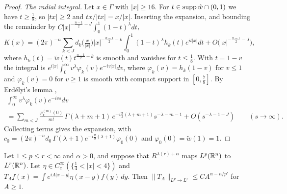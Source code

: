 \begin{proof}
\emph{The radial integral.} Let $x\in\Gamma$ with $|x|\ge16$. For $t\in\operatorname{supp}\tilde w\cap(0,1)$ we have $t\ge\frac18$,
so $|tx|\ge2$ and $tx/|tx|=x/|x|$. Inserting the expansion, and bounding the remainder by
$C|x|^{-\frac{n-1}2-J}\int_0^1(1-t)^\lambda dt$,
\[
K(x)=(2\pi)^{-n}\sum_{k<J}d_k\bigl(\tfrac x{|x|}\bigr)|x|^{-\frac{n-1}2-k}\int_0^1(1-t)^\lambda h_k(t)e^{it|x|}dt
+O\bigl(|x|^{-\frac{n-1}2-J}\bigr),
\]
where $h_k(t)=\tilde w(t)t^{\frac{n-1}2-k}$ is smooth and vanishes for $t\le\frac18$. With $t=1-v$ the integral
is $e^{i|x|}\int_0^\infty v^\lambda\varphi_k(v)e^{-iv|x|}dv$, where $\varphi_k(v)=h_k(1-v)$ for $v\le1$ and
$\varphi_k(v)=0$ for $v\ge1$ is smooth with compact support in $[0,\frac78]$. By Erd\'elyi's lemma
\cite[\S2.8]{Erd56},
\begin{multline*}
\int_0^\infty v^\lambda\varphi_k(v)e^{-ivs}dv\\
=\sum_{m<J}\frac{\varphi_k^{(m)}(0)}{m!}\,\Gamma(\lambda+m+1)\,
e^{-i\frac\pi2(\lambda+m+1)}s^{-\lambda-m-1}+O(s^{-\lambda-1-J})\qquad(s\to\infty).
\end{multline*}
Collecting terms gives the expansion, with
$c_0=(2\pi)^{-n}d_0\,\Gamma(\lambda+1)e^{-i\frac\pi2(\lambda+1)}\varphi_0(0)$ and $\varphi_0(0)=\tilde w(1)=1$.
\end{proof}

\begin{proposition}\label{prop:TA}
Let $1\le p\le r<\infty$ and $\alpha>0$, and suppose that $R^{\lambda(r)+\alpha}$ maps $L^p(\mathbb{R}^n)$ to $L^r(\mathbb{R}^n)$.
Let $\eta\in C^\infty_c(\{\frac14<|x|<4\})$ and $T_Af(x)=\int e^{iA|x-y|}\eta(x-y)f(y)\,dy$. Then
$\|T_A\|_{L^p\to L^r}\le CA^{\alpha-n/p'}$ for $A\ge1$.
\end{proposition}

